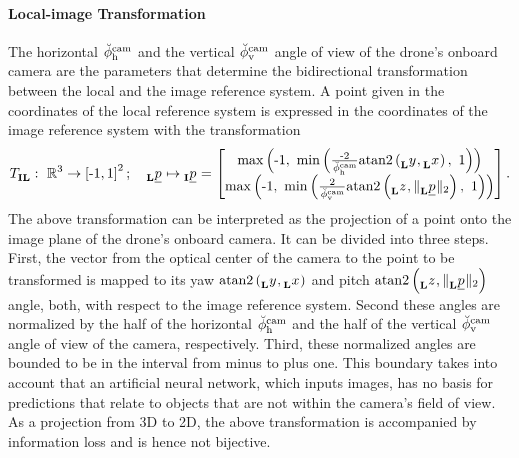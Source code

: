 \paragraph*{Local-image Transformation} $\ $\\
The horizontal
$\ang[\user]{\camera}{\text h}{}{}$
and the vertical
$\ang[\user]{\camera}{\text v}{}{}$
angle of view
of the drone's onboard camera
are the parameters 
that determine the bidirectional transformation 
between the local and the image reference system.
A point given in the coordinates of the local reference system
is expressed in the coordinates of the image reference system with the transformation
\begin{align} \label{equ:local_to_image_transformation}
    \trafo[]{}{\irs\lrs}{}{}
    :\ 
    \mathbb{R}^3 \rightarrow \left[ \text{-}1, 1 \right]^2
    ; \quad
    \pos[]{}{}{\lrs}{} \mapsto \pos[]{}{}{\irs}{}
    =
    \begin{bmatrix}
        \maxof{\text -1}{
            \minof{
                \frac{\text -2}{\ang[\user]{\camera}{\text h}{}{}}
                \mathrm{atan2}\left( \y[]{}{}{\lrs}{}, \x[]{}{}{\lrs}{} \right)
            }{1}
        }
        \\
        \maxof{\text -1}{
            \minof{
                \frac{2}{\ang[\user]{\camera}{\text v}{}{}}
            \mathrm{atan2} \left( \z[]{}{}{\lrs}{}, \| \pos[]{}{}{\lrs}{} \|_2 \right)
            }{1}
        }
    \end{bmatrix}
    .
\end{align}
The above transformation
can be interpreted as the projection of a point onto the image plane 
of the drone's onboard camera.
It can be divided into three steps.
First, the vector from the optical center of the camera 
to the point to be transformed
is mapped to its yaw
$\mathrm{atan2}\left( \y[]{}{}{\lrs}{}, \x[]{}{}{\lrs}{} \right)$
and pitch 
$\mathrm{atan2} \left( \z[]{}{}{\lrs}{}, \| \pos[]{}{}{\lrs}{} \|_2 \right)$
angle, both, with respect to the image reference system.
Second these angles are normalized by 
the half of the horizontal 
$\ang[\user]{\camera}{\text h}{}{}$ 
and the half of the vertical
$\ang[\user]{\camera}{\text v}{}{}$
angle of view of the camera, respectively.
Third, these normalized angles are bounded to be in the interval from minus to plus one.
This boundary takes into account 
that an artificial neural network, which inputs images, 
has no basis for predictions 
that relate to objects that are not within the camera's field of view.
As a projection from 3D to 2D, the above transformation is accompanied by information loss
and is hence not bijective.

